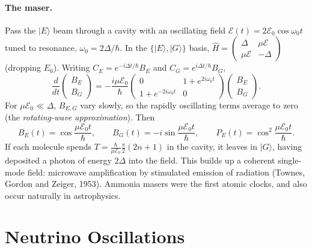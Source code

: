 \paragraph{The maser.} Pass the $|E\rangle$ beam through a cavity with an oscillating field $\mathcal{E}(t) = 2\mathcal{E}_0\cos\omega_0t$ tuned to resonance, $\omega_0 = 2\Delta/\hbar$. In the $\{|E\rangle,|G\rangle\}$ basis, $\hat{H} = \begin{pmatrix}\Delta & \mu\mathcal{E}\\ \mu\mathcal{E} & -\Delta\end{pmatrix}$ (dropping $E_0$). Writing $C_E = e^{-i\Delta t/\hbar}B_E$ and $C_G = e^{i\Delta t/\hbar}B_G$,
\[
    \frac{d}{dt}\begin{pmatrix}B_E\\B_G\end{pmatrix} = -\frac{i\mu\mathcal{E}_0}{\hbar}\begin{pmatrix}0 & 1+e^{2i\omega_0t}\\ 1+e^{-2i\omega_0t} & 0\end{pmatrix}\begin{pmatrix}B_E\\B_G\end{pmatrix}.
\]
For $\mu\mathcal{E}_0\ll\Delta$, $B_{E,G}$ vary slowly, so the rapidly oscillating terms average to zero (the \emph{rotating-wave approximation}). Then
\[
    B_E(t) = \cos\frac{\mu\mathcal{E}_0t}{\hbar},
    \qquad
    B_G(t) = -i\sin\frac{\mu\mathcal{E}_0t}{\hbar},
    \qquad
    P_E(t) = \cos^2\frac{\mu\mathcal{E}_0t}{\hbar}.
\]
If each molecule spends $T = \frac{\hbar}{\mu\mathcal{E}_0}\frac\pi2(2n+1)$ in the cavity, it leaves in $|G\rangle$, having deposited a photon of energy $2\Delta$ into the field. This builds up a coherent single-mode field: microwave amplification by stimulated emission of radiation (Townes, Gordon and Zeiger, 1953). Ammonia masers were the first atomic clocks, and also occur naturally in astrophysics.

\section{Neutrino Oscillations}

